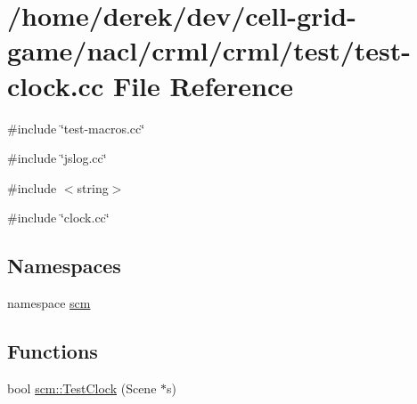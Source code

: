 \hypertarget{test-clock_8cc}{
\section{/home/derek/dev/cell-\/grid-\/game/nacl/crml/crml/test/test-\/clock.cc File Reference}
\label{test-clock_8cc}
}
{\ttfamily \#include \char`\"{}test-\/macros.cc\char`\"{}}\par
{\ttfamily \#include \char`\"{}jslog.cc\char`\"{}}\par
{\ttfamily \#include $<$string$>$}\par
{\ttfamily \#include \char`\"{}clock.cc\char`\"{}}\par
\subsection*{Namespaces}
\begin{DoxyCompactItemize}
\item 
namespace \hyperlink{namespacescm}{scm}
\end{DoxyCompactItemize}
\subsection*{Functions}
\begin{DoxyCompactItemize}
\item 
bool \hyperlink{namespacescm_a2f933647227de09b34772f194e579a63}{scm::TestClock} (Scene $\ast$s)
\end{DoxyCompactItemize}
